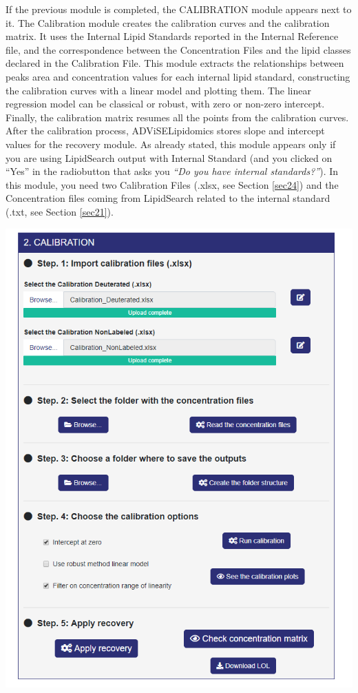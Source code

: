 \documentclass[
]{book}
\begin{document}
If the previous module is completed, the CALIBRATION module appears next to it. The Calibration module creates the calibration curves and the calibration matrix. It uses the Internal Lipid Standards reported in the Internal Reference file, and the correspondence between the Concentration Files and the lipid classes declared in the Calibration File. This module extracts the relationships between peaks area and concentration values for each internal lipid standard, constructing the calibration curves with a linear model and plotting them. The linear regression model can be classical or robust, with zero or non-zero intercept. Finally, the calibration matrix resumes all the points from the calibration curves. After the calibration process, ADViSELipidomics stores slope and intercept values for the recovery module.
As already stated, this module appears only if you are using LipidSearch output with Internal Standard (and you clicked on ``Yes'' in the radiobutton that asks you \emph{``Do you have internal standards?''}). In this module, you need two Calibration Files (.xlsx, see Section \ref{sec24}) and the Concentration files coming from LipidSearch related to the internal standard (.txt, see Section \ref{sec21}).

\begin{center}\includegraphics[width=0.6\linewidth]{images/calibration_step} \end{center}
\end{document}
